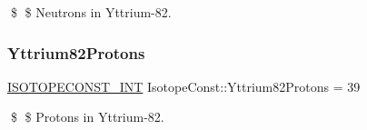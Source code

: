 \$ \$ Neutrons in Yttrium-\/82. \mbox{\label{group___isotope_const-_yttrium-_y82_ga6665278ca9166470d9f600e52dc2a648}} 
\subsubsection{\texorpdfstring{Yttrium82\+Protons}{Yttrium82Protons}}
{\footnotesize\ttfamily \mbox{\hyperlink{group___isotope_const-_macros_ga5f18360b3e99483a35c32d789e62621c}{I\+S\+O\+T\+O\+P\+E\+C\+O\+N\+S\+T\+\_\+\+I\+NT}} Isotope\+Const\+::\+Yttrium82\+Protons = 39}

\$ \$ Protons in Yttrium-\/82. 
